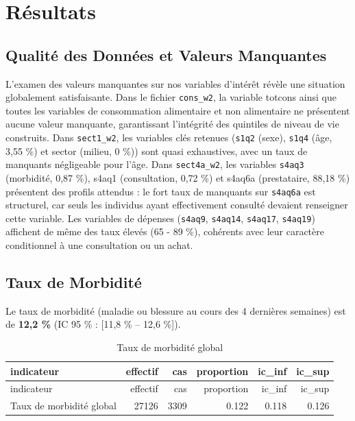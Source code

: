 \documentclass[
  11pt,
]{article}
\begin{document}
\section{Résultats}\label{ruxe9sultats}

\subsection{Qualité des Données et Valeurs
Manquantes}\label{qualituxe9-des-donnuxe9es-et-valeurs-manquantes}

L'examen des valeurs manquantes sur nos variables d'intérêt révèle une
situation globalement satisfaisante. Dans le fichier \texttt{cons\_w2},
la variable totcons ainsi que toutes les variables de consommation
alimentaire et non alimentaire ne présentent aucune valeur manquante,
garantissant l'intégrité des quintiles de niveau de vie construits. Dans
\texttt{sect1\_w2}, les variables clés retenues (\texttt{s1q2} (sexe),
\texttt{s1q4} (âge, 3,55 \%) et sector (milieu, 0 \%)) sont quasi
exhaustives, avec un taux de manquants négligeable pour l'âge. Dans
\texttt{sect4a\_w2}, les variables \texttt{s4aq3} (morbidité, 0,87 \%),
s4aq1 (consultation, 0,72 \%) et s4aq6a (prestataire, 88,18 \%)
présentent des profils attendus : le fort taux de manquants sur
\texttt{s4aq6a} est structurel, car seuls les individus ayant
effectivement consulté devaient renseigner cette variable. Les variables
de dépenses (\texttt{s4aq9}, \texttt{s4aq14}, \texttt{s4aq17},
\texttt{s4aq19}) affichent de même des taux élevés (65 - 89 \%),
cohérents avec leur caractère conditionnel à une consultation ou un
achat.

\subsection{Taux de Morbidité}\label{taux-de-morbidituxe9}

Le taux de morbidité (maladie ou blessure au cours des 4 dernières
semaines) est de \textbf{12,2 \%} (IC 95 \% : {[}11,8 \% -- 12,6 \%{]}).

\begin{longtable}[]{@{}lrrrrr@{}}
\caption{Taux de morbidité global}\tabularnewline
\toprule\noalign{}
indicateur & effectif & cas & proportion & ic\_inf & ic\_sup \\
\midrule\noalign{}
\endfirsthead
\toprule\noalign{}
indicateur & effectif & cas & proportion & ic\_inf & ic\_sup \\
\midrule\noalign{}
\endhead
\bottomrule\noalign{}
\endlastfoot
Taux de morbidité global & 27126 & 3309 & 0.122 & 0.118 & 0.126 \\
\end{longtable}
\end{document}
